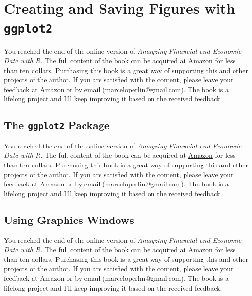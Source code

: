 \documentclass[
  12pt,
]{book}
\newenvironment{pleasebuyit}
{\begin{noteblock}
		
	} {\end{noteblock}}
\begin{document}
\hypertarget{figures}{%
\chapter{\texorpdfstring{Creating and Saving Figures with \texttt{ggplot2}}{Creating and Saving Figures with ggplot2}}\label{figures}}

\begin{pleasebuyit}
You reached the end of the online version of \emph{Analyzing Financial
and Economic Data with R}. The full content of the book can be acquired
at \href{https://www.amazon.com/dp/B084LSNXMN}{Amazon} for less than ten
dollars. Purchasing this book is a great way of supporting this and
other projects of the \href{https://www.msperlin.com/}{author}. If you
are satisfied with the content, please leave your feedback at Amazon or
by email (marceloperlin@gmail.com). The book is a lifelong project and
I'll keep improving it based on the received feedback.
\end{pleasebuyit}

\hypertarget{the-ggplot2-package}{%
\section{\texorpdfstring{The \texttt{ggplot2} Package}{The ggplot2 Package}}\label{the-ggplot2-package}}

\begin{pleasebuyit}
You reached the end of the online version of \emph{Analyzing Financial
and Economic Data with R}. The full content of the book can be acquired
at \href{https://www.amazon.com/dp/B084LSNXMN}{Amazon} for less than ten
dollars. Purchasing this book is a great way of supporting this and
other projects of the \href{https://www.msperlin.com/}{author}. If you
are satisfied with the content, please leave your feedback at Amazon or
by email (marceloperlin@gmail.com). The book is a lifelong project and
I'll keep improving it based on the received feedback.
\end{pleasebuyit}

\hypertarget{using-graphics-windows}{%
\section{Using Graphics Windows}\label{using-graphics-windows}}

\begin{pleasebuyit}
You reached the end of the online version of \emph{Analyzing Financial
and Economic Data with R}. The full content of the book can be acquired
at \href{https://www.amazon.com/dp/B084LSNXMN}{Amazon} for less than ten
dollars. Purchasing this book is a great way of supporting this and
other projects of the \href{https://www.msperlin.com/}{author}. If you
are satisfied with the content, please leave your feedback at Amazon or
by email (marceloperlin@gmail.com). The book is a lifelong project and
I'll keep improving it based on the received feedback.
\end{pleasebuyit}
\end{document}
